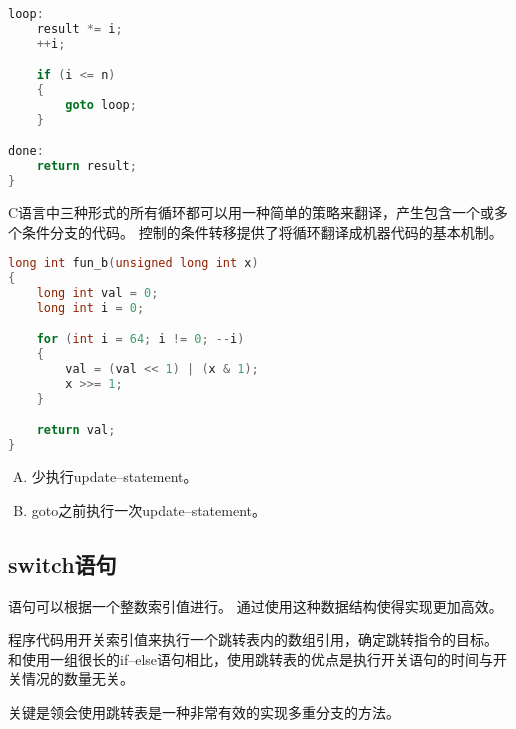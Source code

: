 {{{\begin{practicec}
\begin{lstlisting}[language=C]
loop:
    result *= i;
    ++i;

    if (i <= n)
    {
        goto loop;
    }

done:
    return result;
}
                \end{lstlisting}
            \end{practicec}

            C语言中三种形式的所有循环都可以用一种简单的策略来翻译，产生包含一个或多个条件分支的代码。
            控制的条件转移提供了将循环翻译成机器代码的基本机制。

            \begin{practicec}
                \begin{lstlisting}[language=C]
long int fun_b(unsigned long int x)
{
    long int val = 0;
    long int i = 0;

    for (int i = 64; i != 0; --i)
    {
        val = (val << 1) | (x & 1);
        x >>= 1;
    }

    return val;
}
                \end{lstlisting}
            \end{practicec}

            \begin{practicec}
                \begin{enumerate}[A.]
                    \item 少执行update--statement。
                    \item goto之前执行一次update--statement。
                \end{enumerate}
            \end{practicec}
        }
    }

    \subsection{switch语句}
    {
        语句可以根据一个整数索引值进行。
        通过使用这种数据结构使得实现更加高效。

        程序代码用开关索引值来执行一个跳转表内的数组引用，确定跳转指令的目标。
        和使用一组很长的if--else语句相比，使用跳转表的优点是执行开关语句的时间与开关情况的数量无关。

        关键是领会使用跳转表是一种非常有效的实现多重分支的方法。

}}

